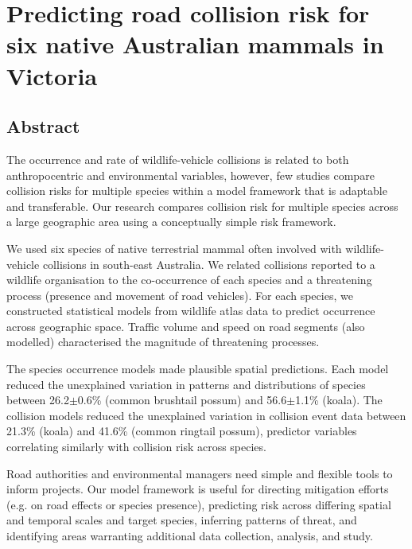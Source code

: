 \chapter{Predicting road collision risk for six native Australian mammals in Victoria}\label{sec:6sp}
\newpage

\begin{localsize}{10}
\section*{\centering Abstract}

The occurrence and rate of wildlife-vehicle collisions is related to both anthropocentric and environmental variables, however, few studies compare collision risks for multiple species within a model framework that is adaptable and transferable.  Our research compares collision risk for multiple species across a large geographic area using a conceptually simple risk framework.

We used six species of native terrestrial mammal often involved with wildlife-vehicle collisions in south-east Australia.  We related collisions reported to a wildlife organisation to the co-occurrence of each species and a threatening process (presence and movement of road vehicles). For each species, we constructed statistical models from wildlife atlas data to predict occurrence across geographic space. Traffic volume and speed on road segments (also modelled) characterised the magnitude of threatening processes.

The species occurrence models made plausible spatial predictions. Each model reduced the unexplained variation in patterns and distributions of species between 26.2$\pm$0.6\% (common brushtail possum) and 56.6$\pm$1.1\% (koala). The collision models reduced the unexplained variation in collision event data between 21.3\% (koala) and 41.6\% (common ringtail possum), predictor variables correlating similarly with collision risk across species.

Road authorities and environmental managers need simple and flexible tools to inform projects. Our model framework is useful for directing mitigation efforts (e.g. on road effects or species presence), predicting risk across differing spatial and temporal scales and target species, inferring patterns of threat, and identifying areas warranting additional data collection, analysis, and study.

\end{localsize}

